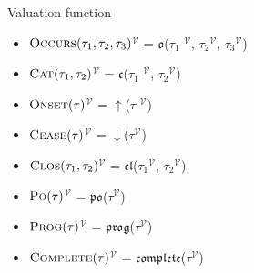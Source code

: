 \begin{defn}Valuation function
	\begin{itemize}
		\item  \textlbrackdbl $\textsc{Occurs}(\tau_1, \tau_2, \tau_3)$\textrbrackdbl$^{\mathcal{V}}$
		      = $\mathfrak{o}$(\textlbrackdbl $\tau_1$ \textrbrackdbl$^{\mathcal{V}}$,
		      \textlbrackdbl $\tau_2$\textrbrackdbl$^{\mathcal{V}}$, \textlbrackdbl $\tau_3$\textrbrackdbl$^{\mathcal{V}}$)

		\item  \textlbrackdbl $\textsc{Cat}(\tau_1, \tau_2)$\textrbrackdbl$^{\mathcal{V}}$
		      = $\mathfrak{c}$(\textlbrackdbl $\tau_1$ \textrbrackdbl$^{\mathcal{V}}$,
		      \textlbrackdbl $\tau_2$\textrbrackdbl$^{\mathcal{V}}$)
		\item \textlbrackdbl $\textsc{Onset}(\tau)$\textrbrackdbl$^{\mathcal{V}}$
		      = $\uparrow$(\textlbrackdbl $\tau$ \textrbrackdbl$^{\mathcal{V}}$)

		\item \textlbrackdbl $\textsc{Cease}(\tau)$\textrbrackdbl$^{\mathcal{V}}$
		      = $\downarrow$(\textlbrackdbl $\tau$\textrbrackdbl$^{\mathcal{V}}$)
		\item \textlbrackdbl $\textsc{Clos}(\tau_1, \tau_2)$\textrbrackdbl$^{\mathcal{V}}$
		      = $\mathfrak{cl}$(\textlbrackdbl $\tau_1$\textrbrackdbl$^{\mathcal{V}}$,
		      \textlbrackdbl $\tau_2$\textrbrackdbl$^{\mathcal{V}}$)
		\item \textlbrackdbl $\textsc{Po}(\tau)$\textrbrackdbl$^{\mathcal{V}}$
		      = $\mathfrak{po}$(\textlbrackdbl $\tau$\textrbrackdbl$^{\mathcal{V}}$)
		\item \textlbrackdbl $\textsc{Prog}(\tau)$\textrbrackdbl$^{\mathcal{V}}$
		      = $\mathfrak{prog}$(\textlbrackdbl $\tau$\textrbrackdbl$^{\mathcal{V}}$)
		\item \textlbrackdbl $\textsc{Complete}(\tau)$\textrbrackdbl$^{\mathcal{V}}$
		      = $\mathfrak{complete}$(\textlbrackdbl $\tau$\textrbrackdbl$^{\mathcal{V}}$)

	\end{itemize}
\end{defn}
